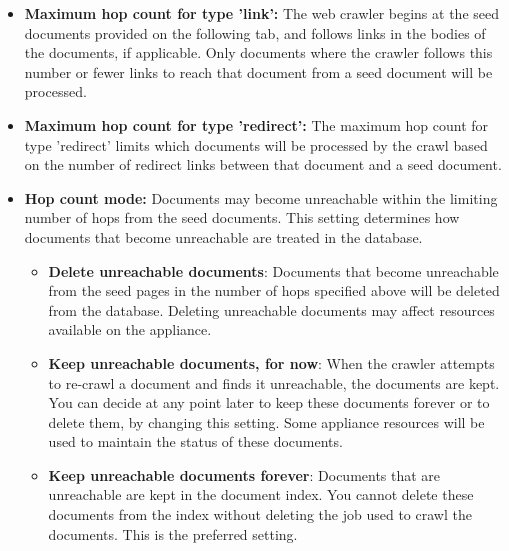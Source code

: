 \begin{itemize}

\item \textbf{Maximum hop count for type 'link':} The web crawler begins
at the seed documents provided on the following tab, and follows links
in the bodies of the documents, if applicable.  Only documents where
the crawler follows this number or fewer links to reach that document
from a seed document will be processed.


\item \textbf{Maximum hop count for type 'redirect':} The maximum hop
count for type 'redirect' limits which documents will be processed by
the crawl based on the number of redirect links between that document
and a seed document.

\item \textbf{Hop count mode:} Documents may become unreachable within the
limiting number of hops from the seed documents. This setting determines
how documents that become unreachable are treated in the database.

\begin{itemize}

\item \textbf{Delete unreachable documents}:
Documents that become unreachable from the seed pages in the number of
hops specified above will be deleted from the database. Deleting
unreachable documents may affect resources available on the appliance.

\item \textbf{Keep unreachable documents, for now}:
When the crawler attempts to re-crawl a document and finds it
unreachable, the documents are kept. You can decide at any point later
to keep these documents forever or to delete them, by changing this
setting. Some appliance resources will be used to maintain the status
of these documents.


\item \textbf{Keep unreachable documents forever}:
Documents that are unreachable are kept in the document index. You
cannot delete these documents from the index without deleting the job
used to crawl the documents. This is the preferred setting.

\end{itemize}

\end{itemize}



